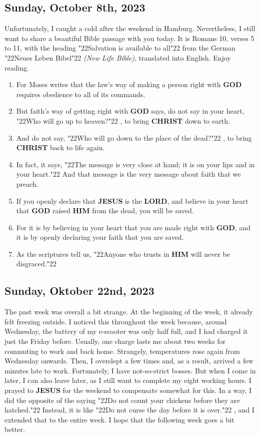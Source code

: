\documentclass[10pt,a5paper]{article}
\newcommand{\Christ}[0]{\textbf{CHRIST}}
\newcommand{\God}[0]{\textbf{GOD}}
\newcommand{\Him}[0]{\textbf{HIM}}
\newcommand{\Jesus}[0]{\textbf{JESUS}}
\newcommand{\Lord}[0]{\textbf{LORD}}
\newcommand{\q}[1]{\char"22{#1}\char"22 }
\begin{document}
	\subsection{Sunday, October 8th, 2023}
		Unfortunately,
		I caught a cold after the weekend in Hamburg.
		Nevertheless,
		I still want to share a beautiful Bible passage with you today.
		It is Romans 10,
		verses 5 to 11,
		with the heading
		\q{Salvation is available to all}
		from the German \q{Neues Leben Bibel} \textit{(New Life Bible)},
		translated into English.
		Enjoy reading.
		\begin{enumerate}[nosep,start=5]
			\item	For Moses writes that the law’s way of making a person right with {\God} requires obedience to all of its commands.
			\item	But faith’s way of getting right with {\God} says,
					do not say in your heart,
					\q{Who will go up to heaven?},
					to bring {\Christ} down to earth.
			\item	And do not say,
					\q{Who will go down to the place of the dead?},
					to bring {\Christ} back to life again.
			\item	In fact,
					it says,
					\q{The message is very close at hand;
					it is on your lips and in your heart.}
					And that message is the very message about faith that we preach.
			\item	If you openly declare that {\Jesus} is the {\Lord},
					and believe in your heart that {\God} raised {\Him} from the dead,
					you will be saved.
			\item	For it is by believing in your heart that you are made right with {\God},
					and it is by openly declaring your faith that you are saved.
			\item	As the scriptures tell us,
					\q{Anyone who trusts in {\Him} will never be disgraced.}
		\end{enumerate}

	\subsection{Sunday, Oktober 22nd, 2023}
		The past week was overall a bit strange.
		At the beginning of the week,
		it already felt freezing outside.
		I noticed this throughout the week because,
		around Wednesday,
		the battery of my e-scooter was only half full,
		and I had charged it just the Friday before.
		Usually,
		one charge lasts me about two weeks for commuting to work and back home.
		Strangely,
		temperatures rose again from Wednesday onwards.
		Then,
		I overslept a few times and,
		as a result,
		arrived a few minutes late to work.
		Fortunately,
		I have not-so-strict bosses.
		But when I come in later,
		I can also leave later,
		as I still want to complete my eight working hours.
		I prayed to {\Jesus} for the weekend to compensate somewhat for this.
		In a way,
		I did the opposite of the saying \q{Do not count your chickens before they are hatched.}
		Instead,
		it is like \q{Do not curse the day before it is over.},
		and I extended that to the entire week.
		I hope that the following week goes a bit better.
				
\end{document}
